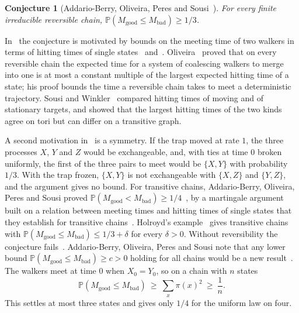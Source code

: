 \documentclass[11pt,a4paper]{article}
\numberwithin{equation}{section}
\newtheorem{conjecture}[theorem]{Conjecture}
\theoremstyle{remark}
\newcommand{\Pp}{\mathbb P}
\newcommand{\good}{M_{\mathrm{good}}}
\newcommand{\bad}{M_{\mathrm{bad}}}
\begin{document}
\begin{conjecture}[Addario-Berry, Oliveira, Peres and Sousi~\cite{ABOPS}]\label{conj:abops}
For every finite irreducible reversible chain, $\Pp(\good\le\bad)\ge1/3$.
\end{conjecture}

In~\cite{ABOPS} the conjecture is motivated by bounds on the meeting time of two walkers in terms of hitting times of single states~\cite[Chapter~14]{AF} and~\cite{Oliveira,SousiWinkler}. Oliveira~\cite{Oliveira} proved that on every reversible chain the expected time for a system of coalescing walkers to merge into one is at most a constant multiple of the largest expected hitting time of a state; his proof bounds the time a reversible chain takes to meet a deterministic trajectory. Sousi and Winkler~\cite{SousiWinkler} compared hitting times of moving and of stationary targets, and showed that the largest hitting times of the two kinds agree on tori but can differ on a transitive graph.

A second motivation in~\cite{ABOPS} is a symmetry. If the trap moved at rate $1$, the three processes $X$, $Y$ and $Z$ would be exchangeable, and, with ties at time $0$ broken uniformly, the first of the three pairs to meet would be $\{X,Y\}$ with probability $1/3$. With the trap frozen, $\{X,Y\}$ is not exchangeable with $\{X,Z\}$ and $\{Y,Z\}$, and the argument gives no bound. For transitive chains, Addario-Berry, Oliveira, Peres and Sousi proved $\Pp(\good<\bad)\ge1/4$~\cite[Theorem~1.2]{ABOPS}, by a martingale argument built on a relation between meeting times and hitting times of single states that they establish for transitive chains~\cite[Section~1]{ABOPS}. Holroyd's example~\cite[Section~6]{ABOPS} gives transitive chains with $\Pp(\good\le\bad)\le1/3+\delta$ for every $\delta>0$. Without reversibility the conjecture fails~\cite[Remark~1.6]{ABOPS}. Addario-Berry, Oliveira, Peres and Sousi note that any lower bound $\Pp(\good\le\bad)\ge c>0$ holding for all chains would be a new result~\cite[Section~1.1]{ABOPS}. The walkers meet at time $0$ when $X_0=Y_0$, so on a chain with $n$ states
\[
\Pp(\good\le\bad)\ \ge\ \sum_x\pi(x)^2\ \ge\ \frac1n .
\]
This settles at most three states and gives only $1/4$ for the uniform law on four.
\end{document}
